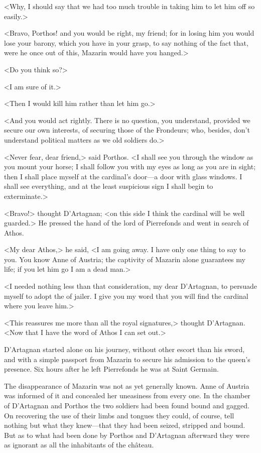 <Why, I should say that we had too much trouble in taking him to let him off so easily.>

<Bravo, Porthos! and you would be right, my friend; for in losing him you would lose your barony, which you have in your grasp, to say nothing of the fact that, were he once out of this, Mazarin would have you hanged.>

<Do you think so?>

<I am sure of it.>

<Then I would kill him rather than let him go.>

<And you would act rightly. There is no question, you understand, provided we secure our own interests, of securing those of the Frondeurs; who, besides, don't understand political matters as we old soldiers do.>

<Never fear, dear friend,> said Porthos. <I shall see you through the window as you mount your horse; I shall follow you with my eyes as long as you are in sight; then I shall place myself at the cardinal's door—a door with glass windows. I shall see everything, and at the least suspicious sign I shall begin to exterminate.>

<Bravo!> thought D'Artagnan; <on this side I think the cardinal will be well guarded.> He pressed the hand of the lord of Pierrefonds and went in search of Athos.

<My dear Athos,> he said, <I am going away. I have only one thing to say to you. You know Anne of Austria; the captivity of Mazarin alone guarantees my life; if you let him go I am a dead man.>

<I needed nothing less than that consideration, my dear D'Artagnan, to persuade myself to adopt the  of jailer. I give you my word that you will find the cardinal where you leave him.>

<This reassures me more than all the royal signatures,> thought D'Artagnan. <Now that I have the word of Athos I can set out.>

D'Artagnan started alone on his journey, without other escort than his sword, and with a simple passport from Mazarin to secure his admission to the queen's presence. Six hours after he left Pierrefonds he was at Saint Germain.

The disappearance of Mazarin was not as yet generally known. Anne of Austria was informed of it and concealed her uneasiness from every one. In the chamber of D'Artagnan and Porthos the two soldiers had been found bound and gagged. On recovering the use of their limbs and tongues they could, of course, tell nothing but what they knew—that they had been seized, stripped and bound. But as to what had been done by Porthos and D'Artagnan afterward they were as ignorant as all the inhabitants of the château.

